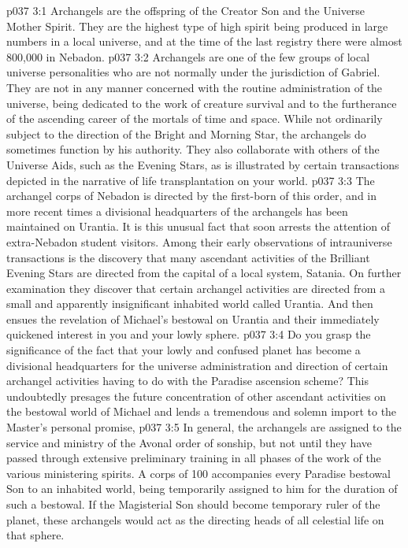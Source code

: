 \vs p037 3:1 Archangels are the offspring of the Creator Son and the Universe Mother Spirit. They are the highest type of high spirit being produced in large numbers in a local universe, and at the time of the last registry there were almost 800,000 in Nebadon.
\vs p037 3:2 Archangels are one of the few groups of local universe personalities who are not normally under the jurisdiction of Gabriel. They are not in any manner concerned with the routine administration of the universe, being dedicated to the work of creature survival and to the furtherance of the ascending career of the mortals of time and space. While not ordinarily subject to the direction of the Bright and Morning Star, the archangels do sometimes function by his authority. They also collaborate with others of the Universe Aids, such as the Evening Stars, as is illustrated by certain transactions depicted in the narrative of life transplantation on your world.
\vs p037 3:3 \pc The archangel corps of Nebadon is directed by the first\hyp{}born of this order, and in more recent times a divisional headquarters of the archangels has been maintained on Urantia. It is this unusual fact that soon arrests the attention of extra\hyp{}Nebadon student visitors. Among their early observations of intrauniverse transactions is the discovery that many ascendant activities of the Brilliant Evening Stars are directed from the capital of a local system, Satania. On further examination they discover that certain archangel activities are directed from a small and apparently insignificant inhabited world called Urantia. And then ensues the revelation of Michael’s bestowal on Urantia and their immediately quickened interest in you and your lowly sphere.
\vs p037 3:4 Do you grasp the significance of the fact that your lowly and confused planet has become a divisional headquarters for the universe administration and direction of certain archangel activities having to do with the Paradise ascension scheme? This undoubtedly presages the future concentration of other ascendant activities on the bestowal world of Michael and lends a tremendous and solemn import to the Master’s personal promise, 
\vs p037 3:5 \pc In general, the archangels are assigned to the service and ministry of the Avonal order of sonship, but not until they have passed through extensive preliminary training in all phases of the work of the various ministering spirits. A corps of 100 accompanies every Paradise bestowal Son to an inhabited world, being temporarily assigned to him for the duration of such a bestowal. If the Magisterial Son should become temporary ruler of the planet, these archangels would act as the directing heads of all celestial life on that sphere.
